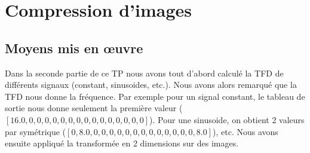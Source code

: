 \documentclass{article}
\begin{document}
\section{Compression d'images}
\subsection{Moyens mis en \oe uvre}
Dans la seconde partie de ce TP nous avons tout d'abord calculé la TFD de différents signaux (constant, sinusoides, etc.). Nous avons alors remarqué que la TFD nous donne la fréquence. Par exemple pour un signal constant, le tableau de sortie nous donne seulement la première valeur ($[16.0,0,0,0,0,0,0,0,0,0,0,0,0,0,0,0]$). Pour une sinusoide, on obtient 2 valeurs par symétrique ($[0,8.0,0,0,0,0,0,0,0,0,0,0,0,0,0,8.0]$), etc. Nous avons ensuite appliqué la transformée en 2 dimensions sur des images.
\end{document}
